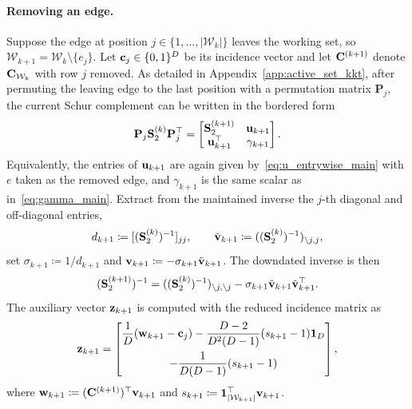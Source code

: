 \paragraph{Removing an edge.} Suppose the edge at position $j\in\{1,\dots,|\mathcal{W}_k|\}$ leaves the working set, so $\mathcal{W}_{k+1}=\mathcal{W}_k\setminus\{e_j\}$. Let $\mathbf{c}_j\in\{0,1\}^D$ be its incidence vector and let $\mathbf{C}^{(k+1)}$ denote $\mathbf{C}_{\mathcal{W}_k}$ with row $j$ removed. As detailed in Appendix~\ref{app:active_set_kkt}, after permuting the leaving edge to the last position with a permutation matrix $\mathbf{P}_j$, the current Schur complement can be written in the bordered form
\begin{equation}
	\mathbf{P}_j\mathbf{S}_2^{(k)}\mathbf{P}_j^\top
	=
	\begin{bmatrix}
		\mathbf{S}_2^{(k+1)} & \mathbf{u}_{k+1}\\
		\mathbf{u}_{k+1}^\top & \gamma_{k+1}
	\end{bmatrix}.
\end{equation}
Equivalently, the entries of $\mathbf{u}_{k+1}$ are again given by~\eqref{eq:u_entrywise_main} with $e$ taken as the removed edge, and $\gamma_{k+1}$ is the same scalar as in~\eqref{eq:gamma_main}. Extract from the maintained inverse the $j$-th diagonal and off-diagonal entries,
\begin{equation}
	d_{k+1}\coloneqq[(\mathbf{S}_2^{(k)})^{-1}]_{jj},
\qquad
\tilde{\mathbf{v}}_{k+1}\coloneqq((\mathbf{S}_2^{(k)})^{-1})_{\setminus j,j},
\end{equation}
set $\sigma_{k+1}\coloneqq 1/d_{k+1}$ and $\mathbf{v}_{k+1}\coloneqq-\sigma_{k+1}\tilde{\mathbf{v}}_{k+1}$. The downdated inverse is then
\begin{equation}\label{eq:S2_inv_downdate_main}
	(\mathbf{S}_2^{(k+1)})^{-1}
	=
	((\mathbf{S}_2^{(k)})^{-1})_{\setminus j,\setminus j}
	-
	\sigma_{k+1}\tilde{\mathbf{v}}_{k+1}\tilde{\mathbf{v}}_{k+1}^\top.
\end{equation}
The auxiliary vector $\mathbf{z}_{k+1}$ is computed with the reduced incidence matrix as
\begin{equation}
	\mathbf{z}_{k+1}
	=
	\begin{bmatrix}
		\displaystyle\frac{1}{D}(\mathbf{w}_{k+1}-\mathbf{c}_j)-\frac{D-2}{D^2(D-1)}(s_{k+1}-1)\mathbf{1}_D\\[10pt]
		\displaystyle-\frac{1}{D(D-1)}(s_{k+1}-1)
	\end{bmatrix},
\end{equation}
where $\mathbf{w}_{k+1}\coloneqq(\mathbf{C}^{(k+1)})^\top\mathbf{v}_{k+1}$ and $s_{k+1}\coloneqq\mathbf{1}_{|\mathcal{W}_{k+1}|}^\top\mathbf{v}_{k+1}$.

